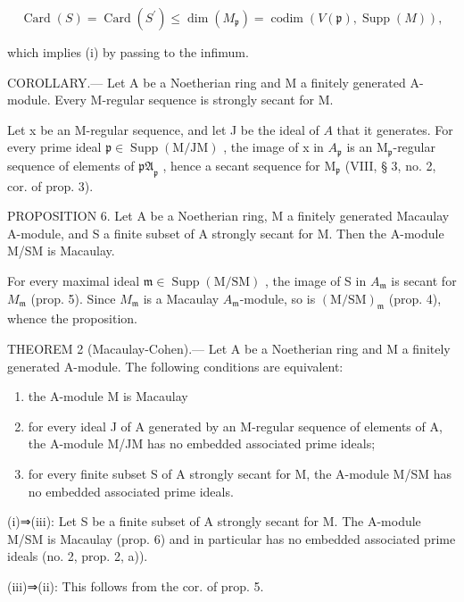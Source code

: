 \[
\operatorname{Card} (S) = \operatorname{Card} \left(S ^ {\prime}\right) \leqslant \dim \left(M _ {\mathfrak {p}}\right) = \operatorname{codim} (V (\mathfrak {p}), \operatorname{Supp} (M)),
\]

which implies (i) by passing to the infimum.

COROLLARY.--- Let A be a Noetherian ring and M a finitely generated A-module. Every M-regular sequence is strongly secant for M.

Let x be an M-regular sequence, and let J be the ideal of \(A\) that it generates. For every prime ideal \(\mathfrak{p} \in \operatorname{Supp}(\mathrm{M/JM})\) , the image of x in \(A_{\mathfrak{p}}\) is an \(\mathrm{M}_{\mathfrak{p}}\)-regular sequence of elements of \(\mathfrak{pA}_{\mathfrak{p}}\) , hence a secant sequence for \(\mathrm{M}_{\mathfrak{p}}\) (VIII, § 3, no. 2, cor. of prop. 3).

PROPOSITION 6. Let A be a Noetherian ring, M a finitely generated Macaulay A-module, and S a finite subset of A strongly secant for M. Then the A-module M/SM is Macaulay.

For every maximal ideal \(\mathfrak{m} \in \operatorname{Supp}(\mathrm{M} / \mathrm{SM})\) , the image of S in \(A_{\mathfrak{m}}\) is secant for \(M_{\mathfrak{m}}\) (prop. 5). Since \(M_{\mathfrak{m}}\) is a Macaulay \(A_{\mathfrak{m}}\)-module, so is \((\mathrm{M} / \mathrm{SM})_{\mathfrak{m}}\) (prop. 4), whence the proposition.

THEOREM 2 (Macaulay-Cohen).--- Let A be a Noetherian ring and M a finitely generated A-module. The following conditions are equivalent:

\begin{enumerate}
\def\labelenumi{(\roman{enumi})}
\item
  the A-module M is Macaulay
\item
  for every ideal J of A generated by an M-regular sequence of elements of A, the A-module M/JM has no embedded associated prime ideals;
\item
  for every finite subset S of A strongly secant for M, the A-module M/SM has no embedded associated prime ideals.
\end{enumerate}

(i)⇒(iii): Let S be a finite subset of A strongly secant for M. The A-module M/SM is Macaulay (prop. 6) and in particular has no embedded associated prime ideals (no. 2, prop. 2, a)).

(iii)⇒(ii): This follows from the cor. of prop. 5.

